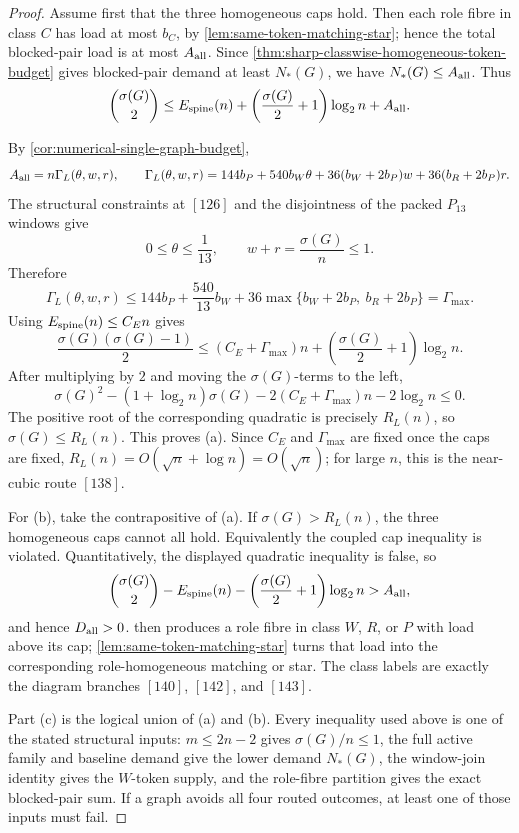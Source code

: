 \documentclass[11pt]{article}
\begin{document}
\begin{proof}
Assume first that the three homogeneous caps hold.  Then each role fibre in
class \(C\) has load at most \(b_C\), by
\cref{lem:same-token-matching-star}; hence the total blocked-pair load is at
most \(A_{\rm all}\).  Since
\cref{thm:sharp-classwise-homogeneous-token-budget} gives blocked-pair demand
at least \(N_*(G)\), we have \(N_*(G)\le A_{\rm all}\).  Thus
\[
\binom{\sigma(G)}2
\le
E_{\rm spine}(n)
+\left(\frac{\sigma(G)}2+1\right)\log_2 n
+A_{\rm all}.
\]

By \cref{cor:numerical-single-graph-budget},
\[
A_{\rm all}=n\Gamma_L(\theta,w,r),
\qquad
\Gamma_L(\theta,w,r)
=144b_P+540b_W\theta
+36(b_W+2b_P)w+36(b_R+2b_P)r .
\]
The structural constraints at \([126]\) and the disjointness of the packed
\(P_{13}\) windows give
\[
0\le\theta\le\frac1{13},\qquad
w+r=\frac{\sigma(G)}n\le1.
\]
Therefore
\[
\Gamma_L(\theta,w,r)
\le
144b_P+\frac{540}{13}b_W
+36\max\{b_W+2b_P,\ b_R+2b_P\}
=\Gamma_{\max}.
\]
Using \(E_{\rm spine}(n)\le C_En\) gives
\[
\frac{\sigma(G)(\sigma(G)-1)}2
\le
(C_E+\Gamma_{\max})n
+\left(\frac{\sigma(G)}2+1\right)\log_2 n .
\]
After multiplying by \(2\) and moving the \(\sigma(G)\)-terms to the left,
\[
\sigma(G)^2-(1+\log_2 n)\sigma(G)
-2(C_E+\Gamma_{\max})n-2\log_2 n
\le0 .
\]
The positive root of the corresponding quadratic is precisely \(R_L(n)\), so
\(\sigma(G)\le R_L(n)\).  This proves (a).  Since \(C_E\) and
\(\Gamma_{\max}\) are fixed once the caps are fixed,
\(R_L(n)=O(\sqrt n+\log n)=O(\sqrt n)\); for large \(n\), this is the
near-cubic route \([138]\).

For (b), take the contrapositive of (a).  If \(\sigma(G)>R_L(n)\), the three
homogeneous caps cannot all hold.  Equivalently the coupled cap inequality is
violated.  Quantitatively, the displayed quadratic inequality is false, so
\[
\binom{\sigma(G)}2
-E_{\rm spine}(n)
-\left(\frac{\sigma(G)}2+1\right)\log_2 n
>A_{\rm all},
\]
and hence \(D_{\rm all}>0\).   then
produces a role fibre in class \(W\), \(R\), or \(P\) with load above its cap;
\cref{lem:same-token-matching-star} turns that load into the corresponding
role-homogeneous matching or star.  The class labels are exactly the diagram
branches \([140]\), \([142]\), and \([143]\).

Part (c) is the logical union of (a) and (b).  Every inequality used above is
one of the stated structural inputs: \(m\le2n-2\) gives \(\sigma(G)/n\le1\),
the full active family and baseline demand give the lower demand \(N_*(G)\),
the window-join identity gives the \(W\)-token supply, and the role-fibre
partition gives the exact blocked-pair sum.  If a graph avoids all four routed
outcomes, at least one of those inputs must fail.
\end{proof}
\end{document}
